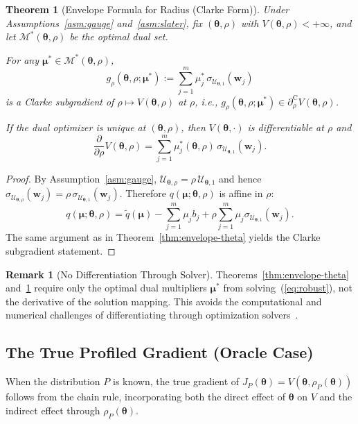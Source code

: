 \documentclass[lettersize,journal]{IEEEtran}
\newcommand{\cU}{\mathcal{U}}
\newcommand{\btheta}{\bm{\theta}}
\newcommand{\bmu}{\bm{\mu}}
\newcommand{\bw}{\bm{w}}
\newcommand{\clsubd}{\partial^{\mathrm{C}}} %
\newcommand{\cM}{\mathcal{M}} %
\newtheorem{theorem}{Theorem}
\theoremstyle{definition}
\newtheorem{remark}{Remark}
\begin{document}
\begin{theorem}[Envelope Formula for Radius (Clarke Form)]\label{thm:envelope-rho}
Under Assumptions~\ref{asm:gauge} and~\ref{asm:slater}, fix $(\btheta,\rho)$ with $V(\btheta,\rho)<+\infty$,
and let $\cM^*(\btheta,\rho)$ be the optimal dual set.

For any $\bmu^*\in\cM^*(\btheta,\rho)$,
\begin{equation}\label{eq:env-rho}
g_{\rho}(\btheta,\rho;\bmu^*)
:=\sum_{j=1}^m \mu_j^*\,\sigma_{\cU_{\btheta,1}}(\bw_j)
\end{equation}
is a Clarke subgradient of $\rho\mapsto V(\btheta,\rho)$ at $\rho$, i.e.,
$g_\rho(\btheta,\rho;\bmu^*)\in \clsubd_{\rho}V(\btheta,\rho)$.

If the dual optimizer is unique at $(\btheta,\rho)$, then $V(\btheta,\cdot)$ is differentiable at $\rho$ and
\[
\frac{\partial}{\partial\rho}V(\btheta,\rho)
=\sum_{j=1}^m \mu_j^*(\btheta,\rho)\,\sigma_{\cU_{\btheta,1}}(\bw_j).
\]
\end{theorem}

\begin{proof}
By Assumption~\ref{asm:gauge}, $\cU_{\btheta,\rho}=\rho\,\cU_{\btheta,1}$ and hence
$\sigma_{\cU_{\btheta,\rho}}(\bw_j)=\rho\,\sigma_{\cU_{\btheta,1}}(\bw_j)$.
Therefore $q(\bmu;\btheta,\rho)$ is affine in $\rho$:
\[
q(\bmu;\btheta,\rho)
=\tilde q(\bmu)-\sum_{j=1}^m \mu_j b_j
+\rho\sum_{j=1}^m \mu_j\sigma_{\cU_{\btheta,1}}(\bw_j).
\]
The same argument as in Theorem~\ref{thm:envelope-theta} yields the Clarke subgradient statement.
\end{proof}

\begin{remark}[No Differentiation Through Solver]
Theorems~\ref{thm:envelope-theta} and~\ref{thm:envelope-rho} require only the optimal dual multipliers $\bmu^*$ from solving~(\ref{eq:robust}), not the derivative of the solution mapping. This avoids the computational and numerical challenges of differentiating through optimization solvers~\cite{Amos2017,Agrawal2019}.
\end{remark}

\subsection{The True Profiled Gradient (Oracle Case)}

When the distribution $P$ is known, the true gradient of $J_P(\btheta) = V(\btheta, \rho_P(\btheta))$ follows from the chain rule, incorporating both the direct effect of $\btheta$ on $V$ and the indirect effect through $\rho_P(\btheta)$.
\end{document}
